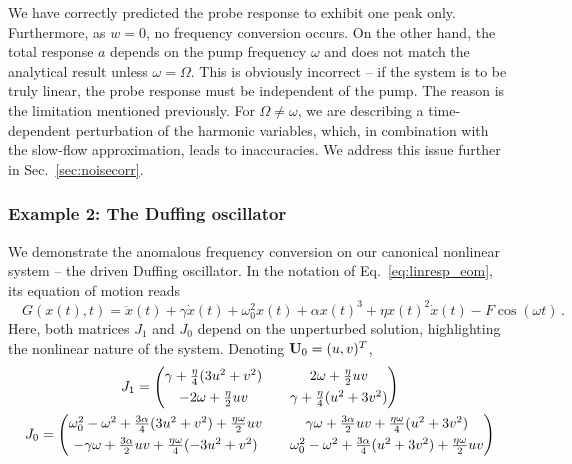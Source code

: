 We have correctly predicted the probe response to exhibit one peak only. Furthermore, as $w = 0$, no frequency conversion occurs. On the other hand, the total response $a$ depends on the pump frequency $\omega$ and does not match the analytical result unless $\omega = \Omega$. This is obviously incorrect -- if the system is to be truly linear, the probe response must be independent of the pump. The reason is the limitation mentioned previously. For $\Omega \neq \omega$, we are describing a time-dependent perturbation of the harmonic variables, which, in combination with the slow-flow approximation, leads to inaccuracies. We address this issue further in Sec.~\ref{sec:noisecorr}.

\subsubsection{Example 2: The Duffing oscillator}

We demonstrate the anomalous frequency conversion on our canonical nonlinear system -- the driven Duffing oscillator. In the notation of Eq.~\eqref{eq:linresp_eom}, its equation of motion reads
\begin{equation} \label{eq:linresp_duffing}
\quad G(x(t), t) = \ddot{x}(t) + \gamma \dot{x}(t) + \omega_0^2 x(t) + \alpha x(t)^3 + \eta x(t)^2 \dot{x}(t) - F \cos(\omega t) \,.
\end{equation}
Here, both matrices $J_1$ and $J_0$ depend on the unperturbed solution, highlighting the nonlinear nature of the system. Denoting $\vb{U}_0 = (u,v)^T$,
\begin{equation}
\begin{gathered}
J_1 = \mqty(\gamma + \frac{\eta}{4} (3u^2 + v^2)  && 2 \omega + \frac{\eta}{2} u v\vspace*{1.2mm} \\  - 2 \omega + \frac{\eta}{2} u v && \gamma + \frac{\eta}{4} (u^2 + 3 v^2) ) \\ \vspace*{0.5mm}
J_0 = \mqty(\omega_0^2 - \omega^2 + \frac{3\alpha}{4} ( 3u^2 + v^2) + \frac{\eta \omega}{2} u v && 
\gamma \omega + \frac{3\alpha}{2} u v + \frac{\eta \omega}{4} (u^2 + 3v^2) \vspace*{1.2mm} \\
-\gamma \omega + \frac{3\alpha}{2} u v + \frac{\eta \omega}{4} (-3u^2 + v^2) && 
\omega_0^2 - \omega^2 + \frac{3\alpha}{4} ( u^2 + 3v^2) + \frac{\eta \omega}{2} u v
)
\end{gathered}
\end{equation}


